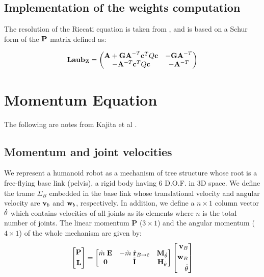 \subsection{Implementation of the weights computation}
     The resolution of the Riccati equation is taken from \cite{Laub1979}, and is
     based on a Schur form of the ${\bf P}$ matrix defined as:

     \begin{equation}
     {\bf Laub_Z} =
     \left(
     \begin{matrix}
     {\bf A} + {\bf GA}^{-T}{\bf c}^TQ{\bf c} & -{\bf GA}^{-T} \\
     -{\bf A}^{-T}{\bf c}^TQ{\bf c} & -{\bf A}^{-T} \\
     \end{matrix}
     \right)
     \end{equation}

\section{Momentum Equation}

The following are notes from Kajita et al \cite{Kajita2003b}.
\subsection{Momentum and joint velocities}
We represent a humanoid robot as a mechanism of tree structure whose root
is a free-flying base link (pelvis), a rigid body having 6 D.O.F. in 
3D space. We define the trame $\Sigma_B$ embedded in the base link whose translational
velocity and angular velocity are $\textit{\bf v}_b$ and $\textit{\bf w}_b$,
respectively. In addition, we define a $n \times 1$ column vector $\dot{\bf \theta}$
which contains velocities of all joints as its elements where $n$ is the total 
number of joints. The linear momentum $\textbf{P}$ ($3 \times 1$) and the
angular momentum ($4 \times 1$) of the whole mechanism are given by:
\begin{equation}
\left[
\begin{aligned}
\textbf{P}\\
\textbf{L}\\
\end{aligned}
\right] = 
\left[
\begin{matrix}
\tilde{m}\; {\bf E} & -\tilde{m}\;\hat{\bf r}_{B \rightarrow \tilde{c}} & {\bf M} _{\dot{\theta}} \\
{\bf 0}            & \tilde{\bf I}                                &{\bf H}_{\dot{\theta}} \\
\end{matrix}
\right]
\left[
\begin{aligned}
\textit{\bf v}_B \\
\textit{\bf w}_B \\
\dot{\bf \theta} \\
\end{aligned}
\right]
\label{eq:GlobalMomentum}
\end{equation}

